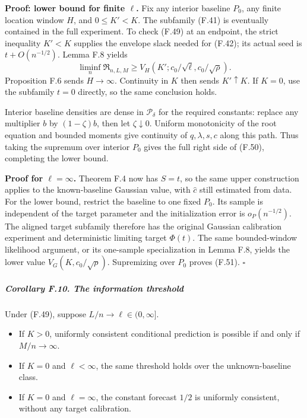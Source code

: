 \textbf{Proof: lower bound for finite \(\ell\).} Fix any interior
baseline \(P_0\), any finite location window \(H\), and \(0\le K'<K\).
The subfamily (F.41) is eventually contained in the full experiment. To
check (F.49) at an endpoint, the strict inequality \(K'<K\) supplies the
envelope slack needed for (F.42); its actual seed is \(t+O(n^{-1/2})\).
Lemma F.8 yields \[
\liminf_n\mathfrak R_{n,L,M}
\ge V_H(K';c_0/\sqrt\ell,c_0/\sqrt\rho).
\] Proposition F.6 sends \(H\to\infty\). Continuity in \(K\) then sends
\(K'\uparrow K\). If \(K=0\), use the subfamily \(t=0\) directly, so the
same conclusion holds.

Interior baseline densities are dense in \(\mathcal P_\delta\) for the
required constants: replace any multiplier \(b\) by \((1-\zeta)b\), then
let \(\zeta\downarrow0\). Uniform monotonicity of the root equation and
bounded moments give continuity of \(q,\lambda,s,c\) along this path.
Thus taking the supremum over interior \(P_0\) gives the full right side
of (F.50), completing the lower bound.

\textbf{Proof for \(\ell=\infty\).} Theorem F.4 now has \(S=t\), so the
same upper construction applies to the known-baseline Gaussian value,
with \(\widehat c\) still estimated from data. For the lower bound,
restrict the baseline to one fixed \(P_0\). Its sample is independent of
the target parameter and the initialization error is \(o_P(n^{-1/2})\).
The aligned target subfamily therefore has the original Gaussian
calibration experiment and deterministic limiting target \(\Phi(t)\).
The same bounded-window likelihood argument, or its one-sample
specialization in Lemma F.8, yields the lower value
\(V_G(K,c_0/\sqrt\rho)\). Supremizing over \(P_0\) proves (F.51).
\(\square\)

\subparagraph{Corollary F.10. The information
threshold}\label{corollary-f.10.-the-information-threshold}

Under (F.49), suppose \(L/n\to\ell\in(0,\infty]\).

\begin{itemize}
\tightlist
\item
  If \(K>0\), uniformly consistent conditional prediction is possible if
  and only if \(M/n\to\infty\).
\item
  If \(K=0\) and \(\ell<\infty\), the same threshold holds over the
  unknown-baseline class.
\item
  If \(K=0\) and \(\ell=\infty\), the constant forecast \(1/2\) is
  uniformly consistent, without any target calibration.
\end{itemize}

